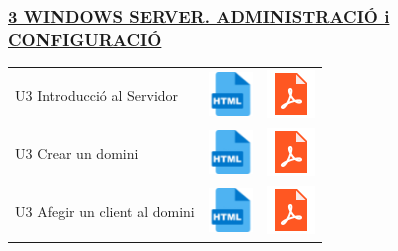 \documentclass[
  12 pt,
  a4paper,
]{article}
\begin{document}
\subsubsection{\texorpdfstring{\hyperref[U3]{3 WINDOWS SERVER.
ADMINISTRACIÓ i
CONFIGURACIÓ}}{3 WINDOWS SERVER. ADMINISTRACIÓ i CONFIGURACIÓ}}\label{windows-server.-administraciuxf3-i-configuraciuxf3}

\begin{longtable}[]{@{}
  >{\raggedright\arraybackslash}p{}
  >{\raggedright\arraybackslash}p{}
  >{\raggedright\arraybackslash}p{}@{}}
\toprule\noalign{}
\endhead
\bottomrule\noalign{}
\endlastfoot
U3 Introducció al Servidor &
\href{U3_WS_ADMINISTRACIO_i_CONFIGURACIO/U3_WS_ADMINISTRACIO_i_CONFIGURACIO--I-.html}{\includegraphics{recursos/iconohtml.png}}
&
\href{U3_WS_ADMINISTRACIO_i_CONFIGURACIO/U3_WS_ADMINISTRACIO_i_CONFIGURACIO--I-.pdf}{\includegraphics{recursos/iconopdf.png}} \\
U3 Crear un domini &
\href{U3_WS_ADMINISTRACIO_i_CONFIGURACIO/U3_WS_ADMINISTRACIO_i_CONFIGURACIO-II-.html}{\includegraphics{recursos/iconohtml.png}}
&
\href{U3_WS_ADMINISTRACIO_i_CONFIGURACIO/U3_WS_ADMINISTRACIO_i_CONFIGURACIO-II-.pdf}{\includegraphics{recursos/iconopdf.png}} \\
U3 Afegir un client al domini &
\href{U3_WS_ADMINISTRACIO_i_CONFIGURACIO/U3_WS_ADMINISTRACIO_i_CONFIGURACIO-III-.html}{\includegraphics{recursos/iconohtml.png}}
&
\href{U3_WS_ADMINISTRACIO_i_CONFIGURACIO/U3_WS_ADMINISTRACIO_i_CONFIGURACIO-III-.pdf}{\includegraphics{recursos/iconopdf.png}} \\

\end{longtable}
\end{document}
